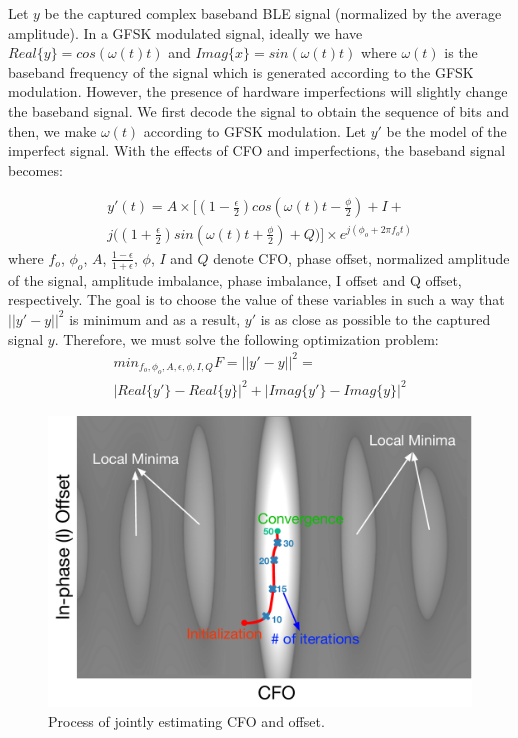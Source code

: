 Let $y$ be the captured complex baseband BLE signal (normalized by the average amplitude). In a GFSK modulated signal, ideally we have $Real\{y\} = cos(\omega(t)t)$ and $Imag\{x\} = sin(\omega(t)t)$ where $\omega(t)$ is the baseband frequency of the signal which is generated according to the GFSK modulation. However, the presence of hardware imperfections will slightly change the baseband signal. We first decode the signal to obtain the sequence of bits and then, we make $\omega(t)$ according to GFSK modulation. Let $y'$ be the model of the imperfect signal. With the effects of CFO and \iq imperfections, the baseband signal becomes:

\begin{gather*}
    y'(t) = A \times \big[(1-\frac{\epsilon}{2})cos(\omega(t)t-\frac{\phi}{2})+I+ \\
    j\big((1+\frac{\epsilon}{2})sin(\omega(t)t+\frac{\phi}{2})+Q\big)\big] \times e^{j(\phi_o+2\pi f_o t)}
\end{gather*}
where $f_o$, $\phi_o$, $A$, $\frac{1-\epsilon}{1+\epsilon}$, $\phi$, $I$ and $Q$ denote CFO, phase offset, normalized amplitude of the signal, \iq amplitude imbalance, \iq phase imbalance, I offset and Q offset, respectively. The goal is to choose the value of these variables in such a way that $||y'-y||^2$ is minimum and as a result, $y'$ is as close as possible to the captured signal $y$. Therefore, we must solve the following optimization problem:
\begin{gather*}
    min_{f_o,\phi_o,A,\epsilon,\phi,I,Q}{F=||y'-y||^2 =} \\ |Real\{y'\}-Real\{y\}|^2+|Imag\{y'\}-Imag\{y\}|^2
\end{gather*}

\begin{figure}
    \centering
    \includegraphics[width=0.9\linewidth]{bletracking/plots/algo_heatmap.pdf} 
    \caption{Process of jointly estimating CFO and \iq offset.}
    \label{fig:heatmap}
\end{figure}

